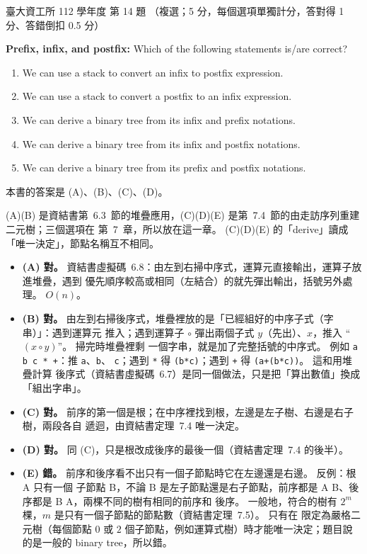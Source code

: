 \begin{pastexam}[label={px:ntu-112-dsa-14}]{臺大資工所 112 學年度 第 14 題}
（複選；5 分，每個選項單獨計分，答對得 1 分、答錯倒扣 0.5 分）

\textbf{Prefix, infix, and postfix:} Which of the following statements is/are correct?
\begin{enumerate}[label=(\Alph*)]
\item We can use a stack to convert an infix to postfix expression.
\item We can use a stack to convert a postfix to an infix expression.
\item We can derive a binary tree from its infix and prefix notations.
\item We can derive a binary tree from its infix and postfix notations.
\item We can derive a binary tree from its prefix and postfix notations.
\end{enumerate}
\end{pastexam}

\begin{pastsoln}
本書的答案是 (A)、(B)、(C)、(D)。

(A)(B) 是資結書第~6.3~節的堆疊應用，(C)(D)(E) 是第~7.4~節的由走訪序列重建二元樹；三個選項在
第~7~章，所以放在這一章。 (C)(D)(E) 的「derive」讀成「唯一決定」，節點名稱互不相同。
\begin{itemize}
\item \textbf{(A) 對。} 資結書虛擬碼~6.8：由左到右掃中序式，運算元直接輸出，運算子放進堆疊，遇到
優先順序較高或相同（左結合）的就先彈出輸出，括號另外處理。 $O(n)$。
\item \textbf{(B) 對。} 由左到右掃後序式，堆疊裡放的是「已經組好的中序子式（字串）」：遇到運算元
推入；遇到運算子 $\circ$ 彈出兩個子式 $y$（先出）、$x$，推入 ``$(x \circ y)$''。 掃完時堆疊裡剩
一個字串，就是加了完整括號的中序式。 例如 \texttt{a b c * +}：推 \texttt{a}、\texttt{b}、
\texttt{c}；遇到 \texttt{*} 得 \texttt{(b*c)}；遇到 \texttt{+} 得 \texttt{(a+(b*c))}。 這和用堆疊計算
後序式（資結書虛擬碼~6.7）是同一個做法，只是把「算出數值」換成「組出字串」。
\item \textbf{(C) 對。} 前序的第一個是根；在中序裡找到根，左邊是左子樹、右邊是右子樹，兩段各自
遞迴，由資結書定理~7.4 唯一決定。
\item \textbf{(D) 對。} 同 (C)，只是根改成後序的最後一個（資結書定理~7.4 的後半）。
\item \textbf{(E) 錯。} 前序和後序看不出只有一個子節點時它在左邊還是右邊。 反例：根 A 只有一個
子節點 B，不論 B 是左子節點還是右子節點，前序都是 A B、後序都是 B A，兩棵不同的樹有相同的前序和
後序。 一般地，符合的樹有 $2^m$ 棵，$m$ 是只有一個子節點的節點數（資結書定理~7.5）。 只有在
限定為嚴格二元樹（每個節點 $0$ 或 $2$ 個子節點，例如運算式樹）時才能唯一決定；題目說的是一般的
binary tree，所以錯。
\end{itemize}
\end{pastsoln}
